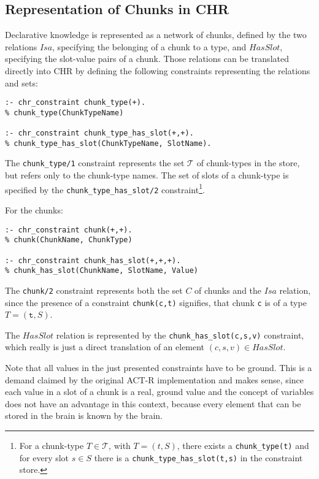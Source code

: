 \begin{example}
\end{example}


\subsection{Representation of Chunks in CHR}

Declarative knowledge is represented as a network of chunks, defined by the two relations $Isa$, specifying the belonging of a chunk to a type, and $HasSlot$, specifying the slot-value pairs of a chunk. Those relations can be translated directly into CHR by defining the following constraints representing the relations and sets:

\begin{lstlisting}
:- chr_constraint chunk_type(+).
% chunk_type(ChunkTypeName)

:- chr_constraint chunk_type_has_slot(+,+).
% chunk_type_has_slot(ChunkTypeName, SlotName).
\end{lstlisting}

The \verb|chunk_type/1| constraint represents the set $\mathcal{T}$ of chunk-types in the store, but refers only to the chunk-type names. The set of slots of a chunk-type is specified by the \verb|chunk_type_has_slot/2| constraint\footnote{For a chunk-type $T \in \mathcal{T}$, with $T = (t, S)$, there exists a \texttt{chunk\_type(t)} and for every slot $s \in S$ there is a \texttt{chunk\_type\_has\_slot(t,s)} in the constraint store.}.

For the chunks:

\begin{lstlisting}
:- chr_constraint chunk(+,+).
% chunk(ChunkName, ChunkType)

:- chr_constraint chunk_has_slot(+,+,+).
% chunk_has_slot(ChunkName, SlotName, Value)
\end{lstlisting}

The \verb|chunk/2| constraint represents both the set $C$ of chunks and the $Isa$ relation, since the presence of a constraint \verb|chunk(c,t)| signifies, that chunk \verb|c| is of a type $T = (\mathtt{t},S)$.

The $HasSlot$ relation is represented by the \verb|chunk_has_slot(c,s,v)| constraint, which really is just a direct translation of an element $(c,s,v) \in HasSlot$.

Note that all values in the just presented constraints have to be ground. This is a demand claimed by the original ACT-R implementation and makes sense, since each value in a slot of a chunk is a real, ground value and the concept of variables does not have an advantage in this context, because every element that can be stored in the brain is known by the brain.

